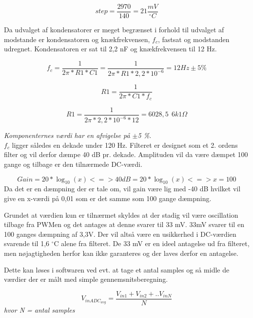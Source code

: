 \begin{equation}
step = \frac{2970}{140} = 21 \frac{mV}{^{\circ}C}
\end{equation}

Da udvalget af kondensatorer er meget begrænset i forhold til udvalget af modstande er kondensatoren og knækfrekvensen, $f_c$, fastsat og modstanden udregnet. Kondensatoren er sat til 2,2 nF og knækfrekvensen til 12 Hz. 

\begin{equation}
f_c = \frac{1}{2 \pi * R1 * C1} = \frac{1}{2 \pi * R1  * 2,2*10^{-6}} = 12 Hz\pm5 \%
\end{equation}

\begin{equation}
R1 = \frac{1}{2 \pi * C1  * f_c}
\end{equation}

\begin{equation}
R1 = \frac{1}{2 \pi * 2,2*10^{-6}  * 12} = 6028,5 \ ~ 6k1\Omega 
\end{equation}

\textit{Komponenternes værdi har en afvigelse på $\pm$5 \%.}\\

$f_c$ ligger således en dekade under 120 Hz. Filteret er designet som et 2. ordens filter og vil derfor dæmpe 40 dB pr. dekade. Amplituden vil da være dæmpet 100 gange og tilbage er den tilnærmede DC-værdi. 

\begin{equation}
Gain = 20 * \log_{10}(x) <=> 40 dB = 20 * \log_ {10}(x) <=> x = 100
\end{equation} 
Da det er en dæmpning der er tale om, vil gain være lig med -40 dB hvilket vil give en x-værdi på 0,01 som er det samme som 100 gange dæmpning.

Grundet at værdien kun er tilnærmet skyldes at der stadig vil være oscillation tilbage fra PWMen og det antages at denne svarer til 33 mV. 33mV svarer til en 100 ganges dæmpning af 3,3V. Der vil altså være en usikkerhed i DC-værdien svarende til 1,6 $^{\circ}$C alene fra filteret. De 33 mV er en ideel antagelse ud fra filteret, men nøjagtigheden herfor kan ikke garanteres og der laves derfor en antagelse.

Dette kan løses i softwaren ved evt. at tage et antal samples og så midle de værdier der er målt med simple gennemsnitsberegning. 

\begin{equation}
V_{inADC_{avg}} = \frac{V_{in1} + V_{in2} + .. V_{inN}}{N}
\end{equation} 
\textit{hvor N = antal samples}


